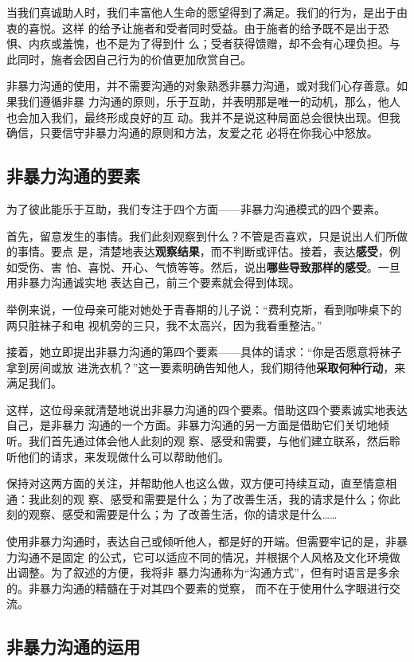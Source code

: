 \documentclass{ctexart}
\begin{document}
当我们真诚助人时，我们丰富他人生命的愿望得到了满足。我们的行为，是出于由衷的喜悦。这样
的给予让施者和受者同时受益。由于施者的给予既不是出于恐惧、内疚或羞愧，也不是为了得到什
么；受者获得馈赠，却不会有心理负担。与此同时，施者会因自己行为的价值更加欣赏自己。

非暴力沟通的使用，并不需要沟通的对象熟悉非暴力沟通，或对我们心存善意。如果我们遵循非暴
力沟通的原则，乐于互助，并表明那是唯一的动机，那么，他人也会加入我们，最终形成良好的互
动。我并不是说这种局面总会很快出现。但我确信，只要信守非暴力沟通的原则和方法，友爱之花
必将在你我心中怒放。

\subsection{非暴力沟通的要素}

为了彼此能乐于互助，我们专注于四个方面------非暴力沟通模式的四个要素。

首先，留意发生的事情。我们此刻观察到什么？不管是否喜欢，只是说出人们所做的事情。要点
是，清楚地表达\textbf{观察结果}，而不判断或评估。接着，表达\textbf{感受}，例如受伤、害
怕、喜悦、开心、气愤等等。然后，说出\textbf{哪些导致那样的感受}。一旦用非暴力沟通诚实地
表达自己，前三个要素就会得到体现。

举例来说，一位母亲可能对她处于青春期的儿子说：``费利克斯，看到咖啡桌下的两只脏袜子和电
视机旁的三只，我不太高兴，因为我看重整洁。''

接着，她立即提出非暴力沟通的第四个要素------具体的请求：``你是否愿意将袜子拿到房间或放
进洗衣机？''这一要素明确告知他人，我们期待他\textbf{采取何种行动}，来满足我们。

这样，这位母亲就清楚地说出非暴力沟通的四个要素。借助这四个要素诚实地表达自己，是非暴力
沟通的一个方面。非暴力沟通的另一方面是借助它们关切地倾听。我们首先通过体会他人此刻的观
察、感受和需要，与他们建立联系，然后聆听他们的请求，来发现做什么可以帮助他们。

保持对这两方面的关注，并帮助他人也这么做，双方便可持续互动，直至情意相通：我此刻的观
察、感受和需要是什么；为了改善生活，我的请求是什么；你此刻的观察、感受和需要是什么；为
了改善生活，你的请求是什么\ldots\ldots

使用非暴力沟通时，表达自己或倾听他人，都是好的开端。但需要牢记的是，非暴力沟通不是固定
的公式，它可以适应不同的情况，并根据个人风格及文化环境做出调整。为了叙述的方便，我将非
暴力沟通称为``沟通方式''，但有时语言是多余的。非暴力沟通的精髓在于对其四个要素的觉察，
而不在于使用什么字眼进行交流。

\subsection{非暴力沟通的运用}
\end{document}
